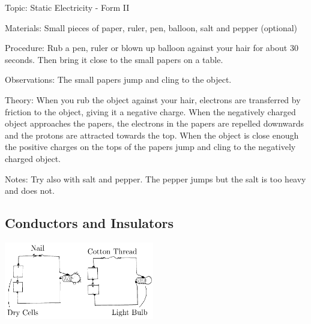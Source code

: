 \begin{multicols}{2}
\begin{description*}
\item[Topic:]{Static Electricity - Form II}
\item[Materials:]{Small pieces of paper, ruler, pen, balloon, salt and pepper (optional)}
\item[Procedure:]{Rub a pen, ruler or blown up balloon against your hair for about 30 seconds. Then bring it close to the small papers on a table.}
\item[Observations:]{The small papers jump and cling to the object.}
\item[Theory:]{When you rub the object against your hair, electrons are transferred by friction to the object, giving it a negative charge. When the negatively charged object approaches the papers, the electrons in the papers are repelled downwards and the protons are attracted towards the top. When the object is close enough the positive charges on the tops of the papers jump and cling to the negatively charged object.}
\item[Notes:]{Try also with salt and pepper. The pepper jumps but the salt is too heavy and does not.}
\end{description*}

\subsection{Conductors and Insulators}

\begin{center}
\includegraphics[width=0.49\textwidth]{./img/conductors-insulators.png}
\end{center}


\end{multicols}
